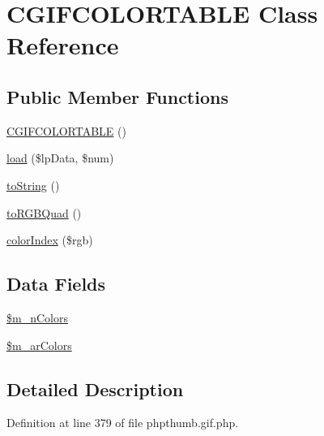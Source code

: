 \hypertarget{class_c_g_i_f_c_o_l_o_r_t_a_b_l_e}{\section{\-C\-G\-I\-F\-C\-O\-L\-O\-R\-T\-A\-B\-L\-E \-Class \-Reference}
\label{class_c_g_i_f_c_o_l_o_r_t_a_b_l_e}
}
\subsection*{\-Public \-Member \-Functions}
\begin{DoxyCompactItemize}
\item 
\hyperlink{class_c_g_i_f_c_o_l_o_r_t_a_b_l_e_afab051fb9192cea1cc5d3b71a953804d}{\-C\-G\-I\-F\-C\-O\-L\-O\-R\-T\-A\-B\-L\-E} ()
\item 
\hyperlink{class_c_g_i_f_c_o_l_o_r_t_a_b_l_e_abe12a48abe6f34cc20eb1205f5714101}{load} (\$lp\-Data, \$num)
\item 
\hyperlink{class_c_g_i_f_c_o_l_o_r_t_a_b_l_e_a5558c5d549f41597377fa1ea8a1cefa3}{to\-String} ()
\item 
\hyperlink{class_c_g_i_f_c_o_l_o_r_t_a_b_l_e_a8644ff80134281c4493e2e8184f32e42}{to\-R\-G\-B\-Quad} ()
\item 
\hyperlink{class_c_g_i_f_c_o_l_o_r_t_a_b_l_e_a761a999927ccbf2c3dd6f18da161dce7}{color\-Index} (\$rgb)
\end{DoxyCompactItemize}
\subsection*{\-Data \-Fields}
\begin{DoxyCompactItemize}
\item 
\hyperlink{class_c_g_i_f_c_o_l_o_r_t_a_b_l_e_a181b05d5af81243db236f79ff3933353}{\$m\-\_\-n\-Colors}
\item 
\hyperlink{class_c_g_i_f_c_o_l_o_r_t_a_b_l_e_aa34e95539ae923d2887acae9c87a30c0}{\$m\-\_\-ar\-Colors}
\end{DoxyCompactItemize}


\subsection{\-Detailed \-Description}


\-Definition at line 379 of file phpthumb.\-gif.\-php.



